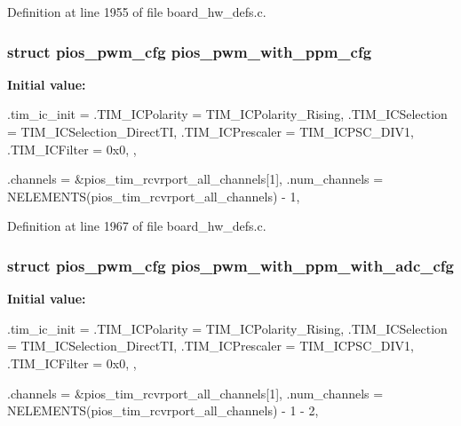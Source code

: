 \-Definition at line 1955 of file board\-\_\-hw\-\_\-defs.\-c.

\hypertarget{group___quanton_ga6a7a8338c617f18384f3b3c5678f5505}{
\subsubsection[{pios\-\_\-pwm\-\_\-with\-\_\-ppm\-\_\-cfg}]{\setlength{\rightskip}{0pt plus 5cm}struct {\bf pios\-\_\-pwm\-\_\-cfg} {\bf pios\-\_\-pwm\-\_\-with\-\_\-ppm\-\_\-cfg}}}\label{group___quanton_ga6a7a8338c617f18384f3b3c5678f5505}
{\bfseries \-Initial value\-:}
\begin{DoxyCode}
 {
        .tim_ic_init = {
                .TIM_ICPolarity = TIM_ICPolarity_Rising,
                .TIM_ICSelection = TIM_ICSelection_DirectTI,
                .TIM_ICPrescaler = TIM_ICPSC_DIV1,
                .TIM_ICFilter = 0x0,
        },
        
        .channels = &pios_tim_rcvrport_all_channels[1],
        .num_channels = NELEMENTS(pios_tim_rcvrport_all_channels) - 1,
}
\end{DoxyCode}


\-Definition at line 1967 of file board\-\_\-hw\-\_\-defs.\-c.

\hypertarget{group___quanton_ga378b6a6bdbab403bbbce1ec7ab110d48}{
\subsubsection[{pios\-\_\-pwm\-\_\-with\-\_\-ppm\-\_\-with\-\_\-adc\-\_\-cfg}]{\setlength{\rightskip}{0pt plus 5cm}struct {\bf pios\-\_\-pwm\-\_\-cfg} {\bf pios\-\_\-pwm\-\_\-with\-\_\-ppm\-\_\-with\-\_\-adc\-\_\-cfg}}}\label{group___quanton_ga378b6a6bdbab403bbbce1ec7ab110d48}
{\bfseries \-Initial value\-:}
\begin{DoxyCode}
 {
        .tim_ic_init = {
                .TIM_ICPolarity = TIM_ICPolarity_Rising,
                .TIM_ICSelection = TIM_ICSelection_DirectTI,
                .TIM_ICPrescaler = TIM_ICPSC_DIV1,
                .TIM_ICFilter = 0x0,
        },
        
        .channels = &pios_tim_rcvrport_all_channels[1],
        .num_channels = NELEMENTS(pios_tim_rcvrport_all_channels) - 1 - 2,
}
\end{DoxyCode}


